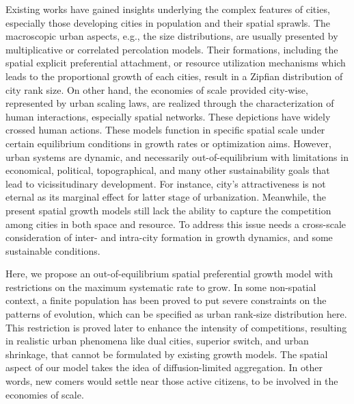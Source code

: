 \documentclass[reprint,unsortedaddress,amsmath,amssymb,aps,prl,showkeys]{revtex4-2}
\begin{document}
Existing works have gained insights underlying the complex features of cities, especially those developing cities in population and their spatial sprawls. The macroscopic urban aspects, e.g., the size distributions, are usually presented by multiplicative or correlated percolation\cite{makse1995modelling,PhysRevE.58.7054,rybski2013distance} models. Their formations, including the spatial explicit preferential attachment\cite{schweitzer1998estimation}, or resource utilization\cite{PhysRevE.90.042815} mechanisms which leads to the proportional growth of each cities, result in a Zipfian distribution of city rank size. On other hand, the economies of scale provided city-wise, represented by urban scaling laws\cite{court2013origins,batty2019urbanscalinglaw,bettencourt2007growth}, are realized through the characterization of human interactions, especially spatial networks\cite{marsili1998interacting,court2013origins,Li2017Simple}. These depictions have widely crossed human actions\cite{ccolak2016understanding,louf2014congestion,fujita1976spatial}. These models function in specific spatial scale under certain equilibrium conditions in growth rates or optimization aims\cite{zipf1949human}. However, urban systems are dynamic, and necessarily out-of-equilibrium with limitations in economical, political, topographical, and many other sustainability goals that lead to vicissitudinary
development\cite{parris2003characterizing,batty2008size}. For instance, city’s attractiveness is not eternal as its marginal effect for latter
stage of urbanization\cite{atkinson2012urban,girardin2009quantifying}. Meanwhile, the present spatial growth models still lack the ability to capture the competition among cities in both space and resource. To address this issue needs a cross-scale consideration of inter- and intra-city formation in growth dynamics, and some sustainable conditions.



Here, we propose an out-of-equilibrium spatial preferential growth model with restrictions on the maximum systematic rate to grow. In some non-spatial context\cite{PhysRevE.55.R3817}, a finite population has been proved to put severe constraints on the patterns of  evolution, which can be specified as urban rank-size distribution here. This restriction is proved later to enhance the intensity of competitions, resulting in realistic urban phenomena like dual cities\cite{silverman2018rethinking}, superior switch\cite{gabaix2004evolution}, and urban shrinkage\cite{haase2014conceptualizing}, that cannot be formulated by existing growth models. The spatial aspect of our model takes the idea of diffusion-limited aggregation\cite{makse1995modelling, rybski2013distance}. In other words, new comers would settle near those active citizens, to be involved in the economies of scale\cite{kleinberg2000navigation}.
\end{document}
